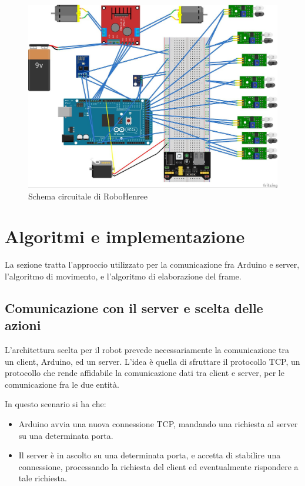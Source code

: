 \documentclass[a4paper,12pt,italian]{article}
\begin{document}
\begin{figure}[H]
	\begin{center}
	\includegraphics[scale=0.3]{circuito}
	\caption{Schema circuitale di RoboHenree}
	\label{Fig: circuito}
	\end{center}
\end{figure}

\pagebreak
\section{Algoritmi e implementazione}
La sezione tratta l'approccio utilizzato per la comunicazione fra Arduino e server, l'algoritmo di movimento, e l'algoritmo di elaborazione del frame.

\subsection{Comunicazione con il server e scelta delle azioni}
L'architettura scelta per il robot prevede necessariamente la comunicazione tra un client, Arduino, ed un server. L'idea è quella di sfruttare il protocollo TCP, un protocollo che rende affidabile la comunicazione dati tra client e server, per le comunicazione fra le due entità.

In questo scenario si ha che:
\begin{itemize}
	\item Arduino avvia una nuova connessione TCP, mandando una richiesta al server su una determinata porta.
	\item Il server è in ascolto su una determinata porta, e accetta di stabilire una connessione, processando la richiesta del client ed eventualmente rispondere a tale richiesta.
\end{itemize}
\end{document}
